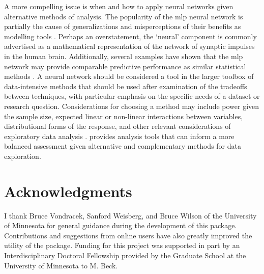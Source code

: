 \documentclass[article,shortnames]{jss}\usepackage[]{graphicx}\usepackage[]{color}
\begin{document}
A more compelling issue is when and how to apply neural networks given alternative methods of analysis.  The popularity of the \ac{mlp} neural network is partially the cause of generalizations and misperceptions of their benefits as modelling tools \citep{Burke97}. Perhaps an overstatement, the `neural' component is commonly advertised as a mathematical representation of the network of synaptic impulses in the human brain.  Additionally, several examples have shown that the \ac{mlp} network may provide comparable predictive performance as similar statistical methods \citep{Feng02,Razi05,Beck14a}.  A neural network should be considered a tool in the larger toolbox of data-intensive methods that should be used after examination of the tradeoffs between techniques, with particular emphasis on the specific needs of a dataset or research question.  Considerations for choosing a method may include power given the sample size, expected linear or non-linear interactions between variables, distributional forms of the response, and other relevant considerations of exploratory data analysis \citep{Zuur10}.   provides analysis tools that can inform a more balanced assessment given alternative and complementary methods for data exploration.

\section[Acknowledgments]{Acknowledgments}
 
I thank Bruce Vondracek, Sanford Weisberg, and Bruce Wilson of the University of Minnesota for general guidance during the development of this package.  Contributions and suggestions from online users have also greatly improved the utility of the package.  Funding for this project was supported in part by an Interdisciplinary Doctoral Fellowship provided by the Graduate School at the University of Minnesota to M. Beck.  



\end{document}
